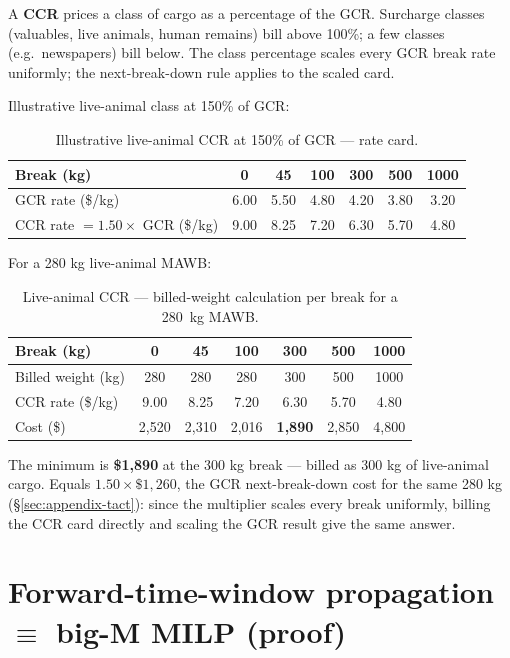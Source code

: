 \documentclass[11pt,a4paper]{article}
\theoremstyle{definition}
\begin{document}
A \textbf{CCR} prices a class of cargo as a percentage of the GCR. Surcharge
classes (valuables, live animals, human remains) bill above 100\%; a few
classes (e.g.\ newspapers) bill below. The class percentage scales every GCR
break rate uniformly; the next-break-down rule applies to the scaled card.

Illustrative live-animal class at 150\% of GCR:
\begin{table}[H]
\centering
\caption{Illustrative live-animal CCR at 150\% of GCR --- rate card.}
\label{tab:ccr-card}
\begin{tabular}{lcccccc}
\toprule
Break (kg) & 0 & 45 & 100 & 300 & 500 & 1000 \\
\midrule
GCR rate (\$/kg) & 6.00 & 5.50 & 4.80 & 4.20 & 3.80 & 3.20 \\
CCR rate $= 1.50 \times$ GCR (\$/kg) & 9.00 & 8.25 & 7.20 & 6.30 & 5.70 & 4.80 \\
\bottomrule
\end{tabular}
\end{table}

For a 280 kg live-animal MAWB:
\begin{table}[H]
\centering
\caption{Live-animal CCR --- billed-weight calculation per break for a 280~kg MAWB.}
\label{tab:ccr-calc}
\begin{tabular}{lcccccc}
\toprule
Break (kg)         & 0 & 45 & 100 & 300 & 500 & 1000 \\
\midrule
Billed weight (kg) & 280 & 280 & 280 & 300 & 500 & 1000 \\
CCR rate (\$/kg)   & 9.00 & 8.25 & 7.20 & 6.30 & 5.70 & 4.80 \\
Cost (\$)          & 2{,}520 & 2{,}310 & 2{,}016 & \textbf{1{,}890} & 2{,}850 & 4{,}800 \\
\bottomrule
\end{tabular}
\end{table}

The minimum is \textbf{\$1{,}890} at the 300 kg break --- billed as 300 kg of
live-animal cargo. Equals $1.50 \times \$1{,}260$, the GCR next-break-down
cost for the same 280 kg (\S\ref{sec:appendix-tact}): since the multiplier
scales every break uniformly, billing the CCR card directly and scaling the
GCR result give the same answer.

\section{Forward-time-window propagation $\equiv$ big-M MILP (proof)}
\label{app:fwd-prop-equiv}
\end{document}

